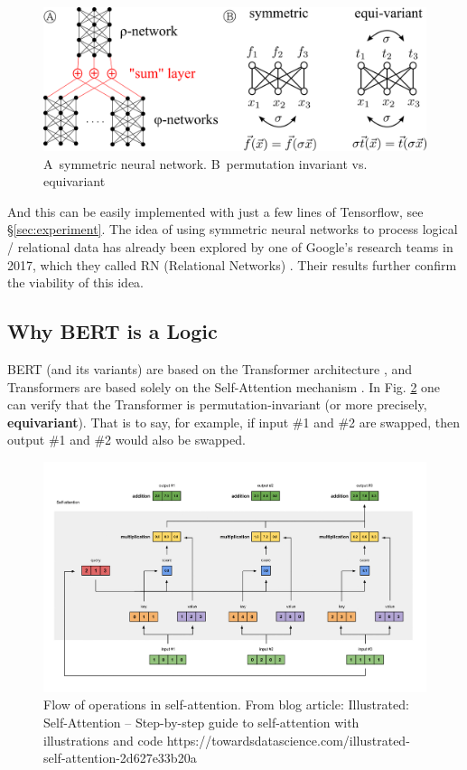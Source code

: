 \documentclass[orivec]{llncs}
\newcommand{\circA}{\textcircled{\scriptsize{A}} \,}
\newcommand{\circB}{\textcircled{\scriptsize{B}} \,}
\begin{document}
\begin{figure}
	\centering
	\includegraphics[scale=0.5]{symmetric.png}
	\caption{\circA symmetric neural network. \circB permutation invariant vs. equivariant}
	\label{fig:symmetric}
\end{figure}

And this can be easily implemented with just a few lines of Tensorflow, see \S\ref{sec:experiment}.  The idea of using symmetric neural networks to process logical / relational data has already been explored by one of Google's research teams in 2017, which they called RN (Relational Networks) \cite{Santoro2017} \cite{Battaglia2018}.  Their results further confirm the viability of this idea.

\subsection{Why BERT is a Logic}

BERT (and its variants) are based on the Transformer architecture \cite{Devlin2018}, and Transformers are based solely on the Self-Attention mechanism \cite{Vaswani2017}.  In Fig. \ref{fig:self-attention} one can verify that the Transformer is permutation-invariant (or more precisely, \textbf{equivariant}).  That is to say, for example, if input \#1 and \#2 are swapped, then output \#1 and \#2 would also be swapped.

\begin{figure}[h]
	\centering
	\includegraphics[scale=0.25]{self-attention.png}
	\caption{Flow of operations in self-attention.  From blog article: Illustrated: Self-Attention	-- Step-by-step guide to self-attention with illustrations and code https://towardsdatascience.com/illustrated-self-attention-2d627e33b20a }
	\label{fig:self-attention}
\end{figure}
\end{document}
